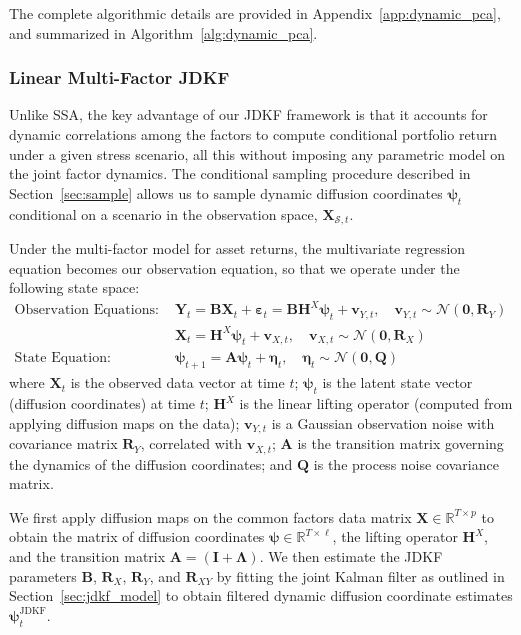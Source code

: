 \documentclass[11pt]{article}
\theoremstyle{plain}
\theoremstyle{definition}
\theoremstyle{remark}
\numberwithin{equation}{section}
\begin{document}
The complete algorithmic details are provided in Appendix~\ref{app:dynamic_pca}, and summarized in Algorithm~\ref{alg:dynamic_pca}.


\subsubsection{Linear Multi-Factor JDKF}

Unlike SSA, the key advantage of our JDKF framework is that it accounts for dynamic correlations among the factors to compute conditional portfolio return under a given stress scenario, all this without imposing any parametric model on the joint factor dynamics. The conditional sampling procedure described in Section~\ref{sec:sample} allows us to sample dynamic diffusion coordinates $\boldsymbol{\psi}_t$ conditional on a scenario in the observation space, $\mathbf{X}_{\mathcal{S},t}$. 

Under the multi-factor model for asset returns, the multivariate regression equation becomes our observation equation, so that we operate under the following state space:
\begin{align}
\text{Observation Equations:} \quad & \mathbf{Y}_t = \mathbf{B}\mathbf{X}_t + \boldsymbol{\varepsilon}_t = \mathbf{B}\mathbf{H}^X\boldsymbol{\psi}_t + \mathbf{v}_{Y,t}, \quad \mathbf{v}_{Y,t} \sim \mathcal{N}(\mathbf{0}, \mathbf{R}_Y) \nonumber \\
& \mathbf{X}_t = \mathbf{H}^X\boldsymbol{\psi}_t + \mathbf{v}_{X,t}, \quad \mathbf{v}_{X,t} \sim \mathcal{N}(\mathbf{0}, \mathbf{R}_X) \\
\text{State Equation:} \quad & \boldsymbol{\psi}_{t+1} = \mathbf{A}\boldsymbol{\psi}_t + \boldsymbol{\eta}_t, \quad \boldsymbol{\eta}_t \sim \mathcal{N}(\mathbf{0}, \mathbf{Q}) \nonumber
\end{align}
where $\mathbf{X}_t$ is the observed data vector at time $t$; $\boldsymbol{\psi}_t$ is the latent state vector (diffusion coordinates) at time $t$; $\mathbf{H}^X$ is the linear lifting operator (computed from applying diffusion maps on the data); $\mathbf{v}_{Y,t}$ is a Gaussian observation noise with covariance matrix $\mathbf{R}_Y$, correlated with $\mathbf{v}_{X,t}$; $\mathbf{A}$ is the transition matrix governing the dynamics of the diffusion coordinates; and $\mathbf{Q}$ is the process noise covariance matrix.

We first apply diffusion maps on the common factors data matrix $\mathbf{X} \in \mathbb{R}^{T \times p}$ to obtain the matrix of diffusion coordinates $\boldsymbol{\psi} \in \mathbb{R}^{T \times \ell}$, the lifting operator $\mathbf{H}^X$, and the transition matrix $\mathbf{A} = (\mathbf{I} + \boldsymbol{\Lambda})$. We then estimate the JDKF parameters $\mathbf{B}$, $\mathbf{R}_X$, $\mathbf{R}_Y$, and $\mathbf{R}_{XY}$ by fitting the joint Kalman filter as outlined in Section~\ref{sec:jdkf_model} to obtain filtered dynamic diffusion coordinate estimates $\boldsymbol{\psi}^{\text{JDKF}}_t$.
\end{document}
